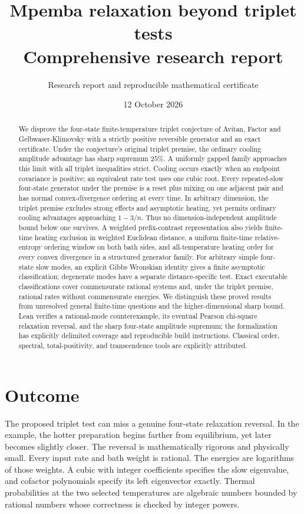 \documentclass[11pt]{article}
\title{Mpemba relaxation beyond triplet tests\\[0.4em]\large Comprehensive research report}
\author{Research report and reproducible mathematical certificate}
\date{12 October 2026}
\begin{document}
\maketitle
\begin{abstract}
We disprove the four-state finite-temperature triplet conjecture of Avitan, Factor and Gelbwaser-Klimovsky with a strictly positive reversible generator and an exact certificate. Under the conjecture's original triplet premise, the ordinary cooling amplitude advantage has sharp supremum $25\%$. A uniformly gapped family approaches this limit with all triplet inequalities strict. Cooling occurs exactly when an endpoint covariance is positive; an equivalent rate test uses one cubic root. Every repeated-slow four-state generator under the premise is a reset plus mixing on one adjacent pair and has normal convex-divergence ordering at every time. In arbitrary dimension, the triplet premise excludes strong effects and asymptotic heating, yet permits ordinary cooling advantages approaching $1-3/n$. Thus no dimension-independent amplitude bound below one survives. A weighted prefix-contrast representation also yields finite-time heating exclusion in weighted Euclidean distance, a uniform finite-time relative-entropy ordering window on both bath sides, and all-temperature heating order for every convex divergence in a structured generator family. For arbitrary simple four-state slow modes, an explicit Gibbs Wronskian identity gives a finite asymptotic classification; degenerate modes have a separate distance-specific test. Exact executable classifications cover commensurate rational systems and, under the triplet premise, rational rates without commensurate energies. We distinguish these proved results from unresolved general finite-time questions and the higher-dimensional sharp bound. Lean verifies a rational-mode counterexample, its eventual Pearson chi-square relaxation reversal, and the sharp four-state amplitude supremum; the formalization has explicitly delimited coverage and reproducible build instructions. Classical order, spectral, total-positivity, and transcendence tools are explicitly attributed.
\end{abstract}

\section{Outcome}
The proposed triplet test can miss a genuine four-state relaxation reversal. In the example, the hotter preparation begins farther from equilibrium, yet later becomes slightly closer. The reversal is mathematically rigorous and physically small. Every input rate and bath weight is rational. The energies are logarithms of those weights. A cubic with integer coefficients specifies the slow eigenvalue, and cofactor polynomials specify its left eigenvector exactly. Thermal probabilities at the two selected temperatures are algebraic numbers bounded by rational numbers whose correctness is checked by integer powers.
\end{document}
